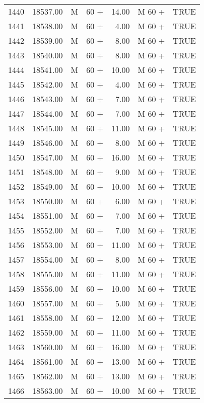\begin{table}[ht]
\begin{tabular}{rrllrll}
  1440 & 18537.00 & M & 60 + & 14.00 & M 60 + & TRUE \\ 
  1441 & 18538.00 & M & 60 + & 4.00 & M 60 + & TRUE \\ 
  1442 & 18539.00 & M & 60 + & 8.00 & M 60 + & TRUE \\ 
  1443 & 18540.00 & M & 60 + & 8.00 & M 60 + & TRUE \\ 
  1444 & 18541.00 & M & 60 + & 10.00 & M 60 + & TRUE \\ 
  1445 & 18542.00 & M & 60 + & 4.00 & M 60 + & TRUE \\ 
  1446 & 18543.00 & M & 60 + & 7.00 & M 60 + & TRUE \\ 
  1447 & 18544.00 & M & 60 + & 7.00 & M 60 + & TRUE \\ 
  1448 & 18545.00 & M & 60 + & 11.00 & M 60 + & TRUE \\ 
  1449 & 18546.00 & M & 60 + & 8.00 & M 60 + & TRUE \\ 
  1450 & 18547.00 & M & 60 + & 16.00 & M 60 + & TRUE \\ 
  1451 & 18548.00 & M & 60 + & 9.00 & M 60 + & TRUE \\ 
  1452 & 18549.00 & M & 60 + & 10.00 & M 60 + & TRUE \\ 
  1453 & 18550.00 & M & 60 + & 6.00 & M 60 + & TRUE \\ 
  1454 & 18551.00 & M & 60 + & 7.00 & M 60 + & TRUE \\ 
  1455 & 18552.00 & M & 60 + & 7.00 & M 60 + & TRUE \\ 
  1456 & 18553.00 & M & 60 + & 11.00 & M 60 + & TRUE \\ 
  1457 & 18554.00 & M & 60 + & 8.00 & M 60 + & TRUE \\ 
  1458 & 18555.00 & M & 60 + & 11.00 & M 60 + & TRUE \\ 
  1459 & 18556.00 & M & 60 + & 10.00 & M 60 + & TRUE \\ 
  1460 & 18557.00 & M & 60 + & 5.00 & M 60 + & TRUE \\ 
  1461 & 18558.00 & M & 60 + & 12.00 & M 60 + & TRUE \\ 
  1462 & 18559.00 & M & 60 + & 11.00 & M 60 + & TRUE \\ 
  1463 & 18560.00 & M & 60 + & 16.00 & M 60 + & TRUE \\ 
  1464 & 18561.00 & M & 60 + & 13.00 & M 60 + & TRUE \\ 
  1465 & 18562.00 & M & 60 + & 13.00 & M 60 + & TRUE \\ 
  1466 & 18563.00 & M & 60 + & 10.00 & M 60 + & TRUE \\ 

\end{tabular}
\end{table}
